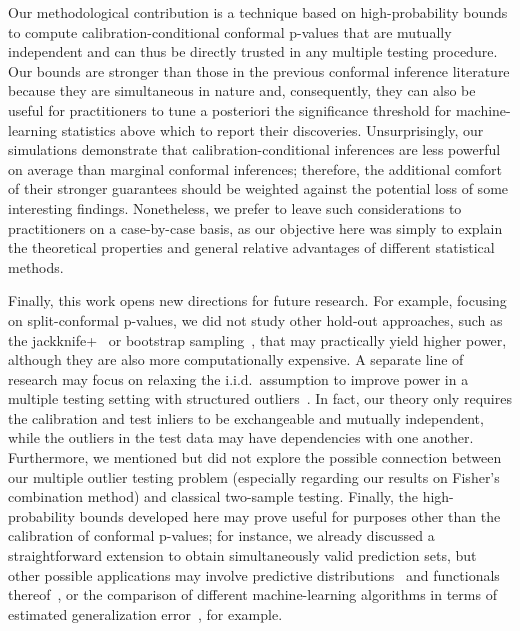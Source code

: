 \documentclass[11pt]{article}
\begin{document}
Our methodological contribution is a technique based on high-probability bounds to compute calibration-conditional conformal p-values that are mutually independent and can thus be directly trusted in any multiple testing procedure. Our bounds are stronger than those in the previous conformal inference literature because they are simultaneous in nature and, consequently, they can also be useful for practitioners to tune a posteriori the significance threshold for machine-learning statistics above which to report their discoveries.
Unsurprisingly, our simulations demonstrate that calibration-conditional inferences are less powerful on average than marginal conformal inferences; therefore, the additional comfort of their stronger guarantees should be weighted against the potential loss of some interesting findings. Nonetheless, we prefer to leave such considerations to practitioners on a case-by-case basis, as our objective here was simply to explain the theoretical properties and general relative advantages of different statistical methods. 

Finally, this work opens new directions for future research. For example, focusing on split-conformal p-values, we did not study other hold-out approaches, such as the jackknife+~\cite{barber2019predictive} or bootstrap sampling~\cite{kim2020predictive}, that may practically yield higher power, although they are also more {computationally expensive}. A separate line of research may focus on relaxing the i.i.d.~assumption to improve power in a multiple testing setting with structured outliers~\cite{li2019multiple}. In fact, our theory only requires the calibration and test inliers to be exchangeable and mutually independent, while the outliers in the test data may have dependencies with one another.
Furthermore, we mentioned but did not explore the possible connection between our multiple outlier testing problem (especially regarding our results on Fisher's combination method) and classical two-sample testing. Finally, the high-probability bounds developed here may prove useful for purposes other than the calibration of conformal p-values; for instance, we already discussed a straightforward extension to obtain simultaneously valid prediction sets, but other possible applications may involve predictive distributions~\cite{vovk2018cross} and functionals thereof~\cite{wisniewski2020application}, or the comparison of different machine-learning algorithms in terms of estimated generalization error~\cite{holland2020making,Bayle2020}, for example.
\end{document}
